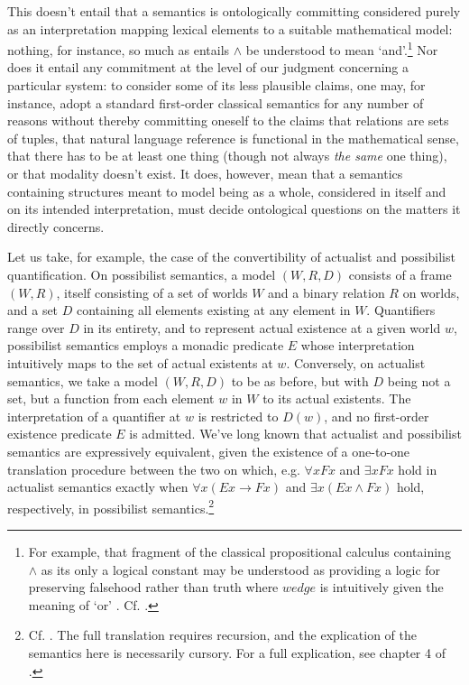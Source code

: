 \documentclass[]{article}
\begin{document}
This doesn't entail that a semantics is ontologically committing considered purely as an interpretation mapping lexical elements to a suitable mathematical model: 
nothing, for instance, so much as entails $\wedge$ be understood to mean `and'.\footnote{For example, 
	that fragment of the classical propositional calculus containing $\wedge$ as its only a logical constant may be understood as providing a logic for preserving falsehood rather than truth 
	where $wedge$ is intuitively given the meaning of `or' . Cf. \autocite[222]{Kripke2015}.}
Nor does it entail any commitment at the level of our judgment concerning a particular system: 
to consider some of its less plausible claims, 
one may, for instance, adopt a standard first-order classical semantics for any number of reasons 
without thereby committing oneself to the claims 
that relations are sets of tuples, 
that natural language reference is functional in the mathematical sense, 
that there has to be at least one thing (though not always \emph{the same} one thing), 
or that modality doesn't exist.
It does, however, mean
that a semantics containing structures meant to model being as a whole, 
considered in itself and on its intended interpretation, 
must decide ontological questions on the matters it directly concerns. 

Let us take, for example, the case of the convertibility of actualist and possibilist quantification. 
On possibilist semantics, a model $(W, R, D)$ consists of a frame $(W, R)$, 
itself consisting of a set of worlds $W$ and a binary relation $R$ on worlds, 
and a set $D$ containing all elements existing at any element in $W$. 
Quantifiers range over $D$ in its entirety, 
and to represent actual existence at a given world $w$, 
possibilist semantics employs a monadic predicate $E$ 
whose interpretation intuitively maps to the set of actual existents at $w$. 
Conversely, on actualist semantics, 
we take a model $(W, R, D)$ to be as before, 
but with $D$ being not a set, but a function from each element $w$ in $W$ to its actual existents. 
The interpretation of a quantifier at $w$ is restricted to $D(w)$, 
and no first-order existence predicate $E$ is admitted.
We've long known that actualist and possibilist semantics are expressively equivalent, 
given the existence of a one-to-one translation procedure between the two on which, e.g. 
$\forall x Fx $ and $\exists x Fx$ hold in actualist semantics 
exactly when $\forall x (Ex \rightarrow Fx)$ and $\exists x(Ex \wedge Fx)$ hold, respectively, in possibilist semantics.\footnote{
	Cf. \autocite{Lejewski1954}. 
	The full translation requires recursion, 
	and the explication of the semantics here is necessarily cursory. 
	For a full explication, see chapter 4 of \autocite{Fitting1998}.}
\end{document}
